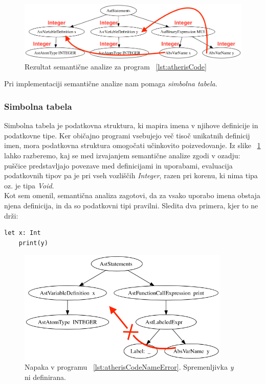 \documentclass[a4paper, 12pt]{book}
\begin{document}
\begin{figure}[h]
	\begin{center}
		\includegraphics[width=1\textwidth]{resources/astSeman.png}
	\end{center}
	\caption{Rezultat semantične analize za program ~\ref{lst:atherisCode}}
	\label{image:astSeman}
\end{figure}

Pri implementaciji semantične analize nam pomaga \textit{simbolna tabela}.

\subsubsection{Simbolna tabela}

Simbolna tabela je podatkovna struktura, ki mapira imena v njihove definicije in podatkovne tipe. \cite{modernCompiler} Ker običajno programi vsebujejo več tisoč unikatnih definicij imen, mora podatkovna struktura omogočati učinkovito poizvedovanje. Iz slike ~\ref{image:astSeman} lahko razberemo, kaj se med izvajanjem semantične analize zgodi v ozadju: puščice predstavljajo povezave med definicijami in uporabami, evaluacija podatkovnih tipov pa je pri vseh vozliščih \textit{Integer}, razen pri korenu, ki nima tipa oz. je tipa \textit{Void}.\\
\indent Kot sem omenil, semantična analiza zagotovi, da za vsako uporabo imena obstaja njena definicija, in da so podatkovni tipi pravilni. Sledita dva primera, kjer to ne drži:

\begin{lstlisting}[caption={Primer programa, kjer spremenljivka \textit{y} ni definirana},label={lst:atherisCodeNameError},captionpos=b]
	let x: Int
	print(y)
\end{lstlisting}

\begin{figure}[h]
	\begin{center}
		\includegraphics[width=0.9\textwidth]{resources/astSemanNameError.png}
	\end{center}
	\caption{Napaka v programu ~\ref{lst:atherisCodeNameError}. Spremenljivka \textit{y} ni definirana.}
	\label{image:astSemanCodeNameError}
\end{figure}
\end{document}
